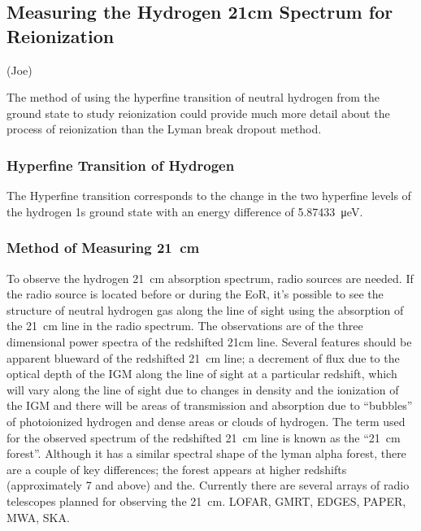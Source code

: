 
    \subsection{Measuring the Hydrogen 21cm Spectrum for Reionization} %
    \label{sub:hydrogen_21cm}
    (Joe)

        The method of using the hyperfine transition of neutral hydrogen from the ground state to study reionization could provide much more detail about the process of reionization than the Lyman break dropout method.

         \subsubsection{Hyperfine Transition of Hydrogen} %
         \label{subsub:Hyperfine_hydrogen}
            The Hyperfine transition corresponds to the change in the two hyperfine levels of the hydrogen 1s ground state with an energy difference of \SI{5.87433}{\micro\electronvolt}\cite{hyperphysics21}.

        \subsubsection{Method of Measuring \SI{21}{\centi\metre}} %
    	\label{subsub:Measuring_21cm}
            To observe the hydrogen \SI{21}{\centi\metre} absorption spectrum, radio sources are needed. If the radio source is located before or during the EoR, it's possible to see the structure of neutral hydrogen gas along the line of sight using the absorption of the \SI{21}{\centi\metre} line in the radio spectrum. The observations are of the three dimensional power spectra of the redshifted  21cm line\cite{liu2011method}. Several features should be apparent blueward of the redshifted \SI{21}{\centi\metre} line; a decrement of flux due to the optical depth of the IGM along the line of sight at a particular redshift, which will vary along the line of sight due to changes in density and the ionization of the IGM and there will be areas of transmission and absorption due to ``bubbles'' of photoionized hydrogen and dense areas or clouds of hydrogen. The term used for the observed spectrum of the redshifted \SI{21}{\centi\metre} line is known as the ``\SI{21}{\centi\metre} forest''. Although it has a similar spectral shape of the lyman alpha forest, there are a couple of key differences; the forest appears at higher redshifts (approximately 7 and above) and the. Currently there are several arrays of radio telescopes planned for observing the \SI{21}{\centi\metre}. LOFAR, GMRT, EDGES, PAPER, MWA, SKA\cite{mack2012detecting}.

